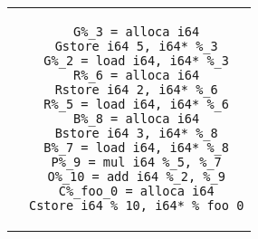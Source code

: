 \begin{center}
\begin{tabular}{cc}
\begin{minipage}{0.45\textwidth}
\begin{tikzpicture}



                    \end{tikzpicture}
                \end{minipage}\hspace{3cm} &
                \begin{minipage}{0.45\textwidth}
                    \lstset{
                    moredelim=[il][\textcolor{orange}]{O},
                    moredelim=[il][\textcolor{green}]{G},
                    moredelim=[il][\textcolor{red}]{R},
                    moredelim=[il][\textcolor{blue}]{B},
                    moredelim=[il][\textcolor{cyan}]{C},
                    moredelim=[il][\textcolor{purple}]{P},
                    }
                    \begin{lstlisting}
G%_3 = alloca i64
Gstore i64 5, i64* %_3
G%_2 = load i64, i64* %_3
R%_6 = alloca i64
Rstore i64 2, i64* %_6
R%_5 = load i64, i64* %_6
B%_8 = alloca i64
Bstore i64 3, i64* %_8
B%_7 = load i64, i64* %_8
P%_9 = mul i64 %_5, %_7
O%_10 = add i64 %_2, %_9
C%_foo_0 = alloca i64
Cstore i64 %_10, i64* %_foo_0
                    \end{lstlisting}
                \end{minipage}
            \end{tabular}
        \end{center}


